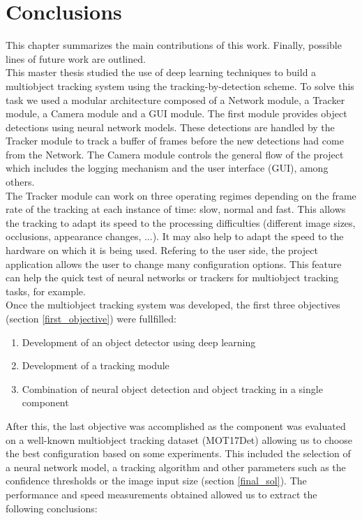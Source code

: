 \chapter{Conclusions}
This chapter summarizes the main contributions of this work. Finally, possible lines of future work are outlined.\\
This master thesis studied the use of deep learning techniques to build a multiobject tracking system using the tracking-by-detection scheme. To solve this task we used a modular architecture composed of a Network module, a Tracker module, a Camera module and a GUI module. The first module provides object detections using neural network models. These detections are handled by the Tracker module to track a buffer of frames before the new detections had come from the Network. The Camera module controls the general flow of the project which includes the logging mechanism and the user interface (GUI), among others.\\
The Tracker module can work on three operating regimes depending on the frame rate of the tracking at each instance of time: slow, normal and fast. This allows the tracking to adapt its speed to the processing difficulties (different image sizes, occlusions, appearance changes, ...). It may also help to adapt the speed to the hardware on which it is being used.
Refering to the user side, the project application allows the user to change many configuration options. This feature can help the quick test of neural networks or trackers for multiobject tracking tasks, for example.\\
Once the multiobject tracking system was developed, the first three objectives (section \ref{first_objective}) were fullfilled:
\begin{enumerate}
    \item Development of an object detector using deep learning
    \item Development of a tracking module
    \item Combination of neural object detection and object tracking in a single component
\end{enumerate}
After this, the last objective was accomplished as the component was evaluated on a well-known multiobject tracking dataset (MOT17Det) allowing us to choose the best configuration based on some experiments. This included the selection of a neural network model, a tracking algorithm and other parameters such as the confidence thresholds or the image input size (section \ref{final_sol}). The performance and speed measurements obtained allowed us to extract the following conclusions:
